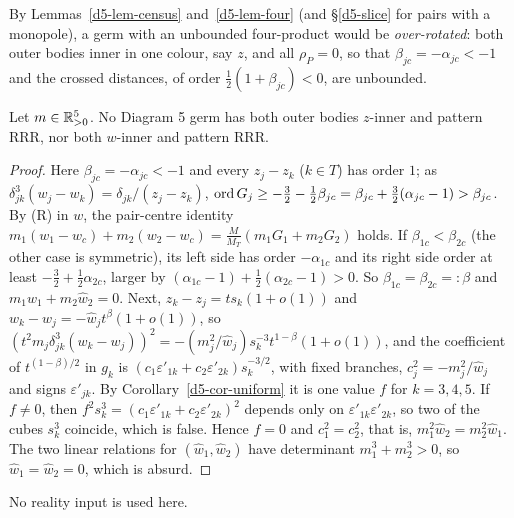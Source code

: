 By Lemmas~\ref{d5-lem-census} and~\ref{d5-lem-four} (and \S\ref{d5-slice} for pairs with a
monopole), a germ with an unbounded four-product would be \emph{over-rotated}: both outer bodies
inner in one colour, say $z$, and all $\rho_P=0$, so that $\beta_{jc}=-\alpha_{jc}<-1$ and the
crossed distances, of order $\frac12(1+\beta_{jc})<0$, are unbounded.

\begin{proposition}\label{d5-prop-over}
Let $m\in\mathbb{R}_{>0}^5$.  No Diagram 5 germ has both outer bodies $z$-inner and pattern RRR, nor both
$w$-inner and pattern RRR.
\end{proposition}

\begin{proof}
Here $\beta_{jc}=-\alpha_{jc}<-1$ and every $z_j-z_k$ ($k\in T$) has order $1$; as
$\delta_{jk}^3(w_j-w_k)=\delta_{jk}/(z_j-z_k)$,
$\operatorname{ord} G_j\ge-\frac32-\frac12\beta_{jc}=\beta_{jc}+\frac32(\alpha_{jc}-1)>\beta_{jc}$.  By (R) in $w$, the
pair-centre identity $m_1(w_1-w_c)+m_2(w_2-w_c)=\frac M{M_T}(m_1G_1+m_2G_2)$ holds.  If
$\beta_{1c}<\beta_{2c}$ (the other case is symmetric), its left side has order $-\alpha_{1c}$ and its
right side order at least
$-\frac32+\frac12\alpha_{2c}$, larger by $(\alpha_{1c}-1)+\frac12(\alpha_{2c}-1)>0$.  So
$\beta_{1c}=\beta_{2c}=:\beta$ and $m_1\hat w_1+m_2\hat w_2=0$.  Next, $z_k-z_j=ts_k(1+o(1))$ and
$w_k-w_j=-\hat w_jt^\beta(1+o(1))$, so
$(t^2m_j\delta_{jk}^3(w_k-w_j))^2=-(m_j^2/\hat w_j)s_k^{-3}t^{1-\beta}(1+o(1))$, and the coefficient of
$t^{(1-\beta)/2}$ in $g_k$ is $(c_1\varepsilon'_{1k}+c_2\varepsilon'_{2k})s_k^{-3/2}$, with fixed
branches, $c_j^2=-m_j^2/\hat w_j$ and signs $\varepsilon'_{jk}$.  By Corollary~\ref{d5-cor-uniform}
it is one value $f$ for $k=3,4,5$.  If $f\ne0$, then $f^2s_k^3=(c_1\varepsilon'_{1k}+c_2\varepsilon'_{2k})^2$
depends only on $\varepsilon'_{1k}\varepsilon'_{2k}$, so two of the cubes $s_k^3$ coincide, which is
false.  Hence $f=0$ and $c_1^2=c_2^2$, that is, $m_1^2\hat w_2=m_2^2\hat w_1$.  The two linear
relations for $(\hat w_1,\hat w_2)$ have determinant $m_1^3+m_2^3>0$, so $\hat w_1=\hat w_2=0$,
which is absurd.
\end{proof}
No reality input is used here.

